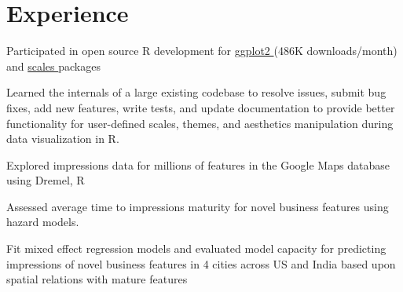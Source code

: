 \documentclass[]{deedy-resume-openfont}
\begin{document}
\hfill
\begin{minipage}[t]{0.66\textwidth} 


\section{Experience}

\vspace{\topsep} %
\begin{tightemize}
\item Participated in open source R development for \href{https://github.com/tidyverse/ggplot2}{ggplot2 \faGithub{}} (486K downloads/month) and \href{https://github.com/r-lib/scales}{scales \faGithub} packages
\item Learned the internals of a large existing codebase to resolve issues, submit bug fixes, add new features, write tests, and update documentation to provide better functionality for user-defined scales, themes, and aesthetics manipulation during data visualization in R. 
\end{tightemize}
\sectionsep

\begin{tightemize}
\item Explored impressions data for millions of features in the Google Maps database using Dremel, R
\item Assessed average time to impressions maturity for novel business features using hazard models.
\item Fit mixed effect regression models and evaluated model capacity for predicting impressions of novel business features in 4 cities across US and India based upon spatial relations with mature features
\end{tightemize}
\sectionsep



\end{minipage}
\end{document}
